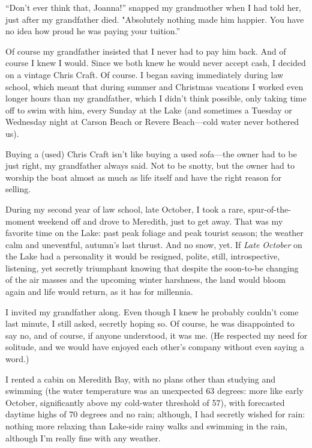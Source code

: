 ``Don't ever think that, Joanna!'' snapped my grandmother when I had
told her, just after my grandfather died. "Absolutely nothing made him
happier. You have no idea how proud he was paying your tuition.''

Of course my grandfather insisted that I never had to pay him back. And
of course I knew I would. Since we both knew he would never accept cash,
I decided on a vintage Chris Craft. Of course. I began saving
immediately during law school, which meant that during summer and
Christmas vacations I worked even longer hours than my grandfather,
which I didn't think possible, only taking time off to swim with him,
every Sunday at the Lake (and sometimes a Tuesday or Wednesday night at
Carson Beach or Revere Beach---cold water never bothered us).

Buying a (used) Chris Craft isn't like buying a used sofa---the owner
had to be just right, my grandfather always said. Not to be snotty, but
the owner had to worship the boat almost as much as life itself and have
the right reason for selling.

During my second year of law school, late October, I took a rare,
spur-of-the-moment weekend off and drove to Meredith, just to get away.
That was my favorite time on the Lake: past peak foliage and peak
tourist season; the weather calm and uneventful, autumn's last thrust.
And no snow, yet. If \emph{Late October} on the Lake had a personality
it would be resigned, polite, still, introspective, listening, yet
secretly triumphant knowing that despite the soon-to-be changing of the
air masses and the upcoming winter harshness, the land would bloom again
and life would return, as it has for millennia.

I invited my grandfather along. Even though I knew he probably couldn't
come last minute, I still asked, secretly hoping so. Of course, he was
disappointed to say no, and of course, if anyone understood, it was me.
(He respected my need for solitude, and we would have enjoyed each
other's company without even saying a word.)

I rented a cabin on Meredith Bay, with no plans other than studying and
swimming (the water temperature was an unexpected 63 degrees: more like
early October, significantly above my cold-water threshold of 57), with
forecasted daytime highs of 70 degrees and no rain; although, I had
secretly wished for rain: nothing more relaxing than Lake-side rainy
walks and swimming in the rain, although I'm really fine with any
weather.

